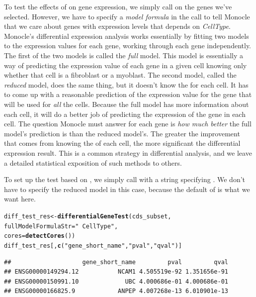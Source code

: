 \documentclass[10pt,oneside]{article}\usepackage[]{graphicx}\usepackage[]{color}
\makeatletter
\newcommand{\hlstr}[1]{\textcolor[rgb]{0.192,0.494,0.8}{#1}}%
\newcommand{\hlstd}[1]{\textcolor[rgb]{0.345,0.345,0.345}{#1}}%
\newcommand{\hlkwb}[1]{\textcolor[rgb]{0.69,0.353,0.396}{#1}}%
\newcommand{\hlkwc}[1]{\textcolor[rgb]{0.333,0.667,0.333}{#1}}%
\newcommand{\hlkwd}[1]{\textcolor[rgb]{0.737,0.353,0.396}{\textbf{#1}}}%
\newenvironment{kframe}{%
 \def\at@end@of@kframe{}%
 \ifinner\ifhmode%
  \def\at@end@of@kframe{\end{minipage}}%
  \begin{minipage}{\columnwidth}%
 \fi\fi%
 \def\FrameCommand##1{\hskip\@totalleftmargin \hskip-\fboxsep
 \colorbox{shadecolor}{##1}\hskip-\fboxsep
     \hskip-\linewidth \hskip-\@totalleftmargin \hskip\columnwidth}%
 \MakeFramed {\advance\hsize-\width
   \@totalleftmargin\z@ \linewidth\hsize
   \@setminipage}}%
 {\par\unskip\endMakeFramed%
 \at@end@of@kframe}
\newenvironment{knitrout}{}{} %
\makeatother
\begin{document}
To test the effects of  on gene expression, we simply call  on the genes we've selected. However, we have to specify a \emph{model formula} in the call to tell Monocle that we care about genes with expression levels that depends on \emph{CellType}.  Monocle's differential expression analysis works essentially by fitting two models to the expression values for each gene, working through each gene independently.  The first of the two models is called the \emph{full} model.  This model is essentially a way of predicting the expression value of each gene in a given cell knowing only whether that cell is a fibroblast or a myoblast.  The second model, called the \emph{reduced} model, does the same thing, but it doesn't know the  for each cell.  It has to come up with a reasonable prediction of the expression value for the gene that will be used for \emph{all} the cells. Because the full model has more information about each cell, it will do a better job of predicting the expression of the gene in each cell.  The question Monocle must answer for each gene is \emph{how much better} the full model's prediction is than the reduced model's. The greater the improvement that comes from knowing the  of each cell, the more significant the differential expression result. This is a common strategy in differential analysis, and we leave a detailed statistical exposition of such methods to others.

To set up the test based on , we simply call  with a string specifying .  We don't have to specify the reduced model in this case, because the default of  is what we want here.

\begin{knitrout}
\color{fgcolor}\begin{kframe}
\begin{alltt}
\hlstd{diff_test_res} \hlkwb{<-} \hlkwd{differentialGeneTest}\hlstd{(cds_subset,}
                                      \hlkwc{fullModelFormulaStr}\hlstd{=}\hlstr{"~CellType"}\hlstd{,}
                                      \hlkwc{cores} \hlstd{=} \hlkwd{detectCores}\hlstd{())}
\hlstd{diff_test_res[,}\hlkwd{c}\hlstd{(}\hlstr{"gene_short_name"}\hlstd{,} \hlstr{"pval"}\hlstd{,} \hlstr{"qval"}\hlstd{)]}
\end{alltt}
\begin{verbatim}
##                    gene_short_name         pval         qval
## ENSG00000149294.12           NCAM1 4.505519e-92 1.351656e-91
## ENSG00000150991.10             UBC 4.000686e-01 4.000686e-01
## ENSG00000166825.9            ANPEP 4.007268e-13 6.010901e-13
\end{verbatim}
\end{kframe}
\end{knitrout}
\end{document}
